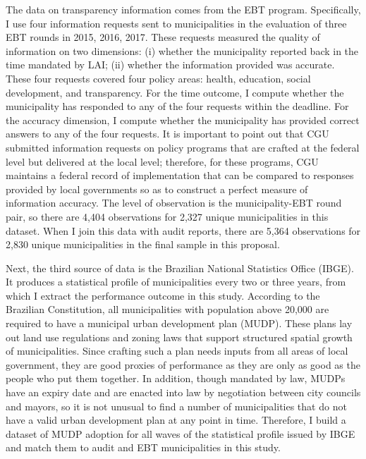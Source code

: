 \documentclass[11pt]{article}
\begin{document}
The data on transparency information comes from the EBT program. Specifically, I use four information requests sent to municipalities in the evaluation of three EBT rounds in 2015, 2016, 2017. These requests measured the quality of information on two dimensions: (i) whether the municipality reported back in the time mandated by LAI; (ii) whether the information provided was accurate. These four requests covered four policy areas: health, education, social development, and transparency. For the time outcome, I compute whether the municipality has responded to any of the four requests within the deadline. For the accuracy dimension, I compute whether the municipality has provided correct answers to any of the four requests. It is important to point out that CGU submitted information requests on policy programs that are crafted at the federal level but delivered at the local level; therefore, for these programs, CGU maintains a federal record of implementation that can be compared to responses provided by local governments so as to construct a perfect measure of information accuracy. The level of observation is the municipality-EBT round pair, so there are 4,404 observations for 2,327 unique municipalities in this dataset. When I join this data with audit reports, there are 5,364 observations for 2,830 unique municipalities in the final sample in this proposal.

Next, the third source of data is the Brazilian National Statistics Office (IBGE). It produces a statistical profile of municipalities every two or three years, from which I extract the performance outcome in this study. According to the Brazilian Constitution, all municipalities with population above 20,000 are required to have a municipal urban development plan (MUDP). These plans lay out land use regulations and zoning laws that support structured spatial growth of municipalities. Since crafting such a plan needs inputs from all areas of local government, they are good proxies of performance as they are only as good as the people who put them together. In addition, though mandated by law, MUDPs have an expiry date and are enacted into law by negotiation between city councils and mayors, so it is not unusual to find a number of municipalities that do not have a valid urban development plan at any point in time. Therefore, I build a dataset of MUDP adoption for all waves of the statistical profile issued by IBGE and match them to audit and EBT municipalities in this study.
\end{document}
